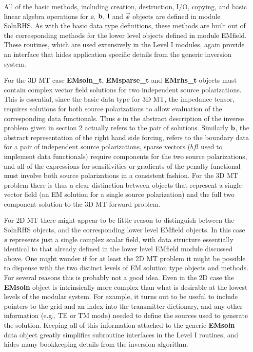 All of the basic methods, including creation, destruction,
I/O, copying, and basic linear algebra operations for $\ee$, ${\bf b}$,
$\bf l$ and $\vec\ee$ objects are defined in module SolnRHS.  
As with the basic data type definitions, 
these methods are built out of the corresponding
methods for the lower level objects defined in module EMfield.
These routines, which are used extensively in the
Level I modules,  again provide an interface that hides 
application specific details from the generic inversion system.

For the 3D MT case {\bf EMsoln\_t}, {\bf EMsparse\_t}
and {\bf EMrhs\_t} objects must contain complex
vector field solutions for two independent source polarizations.  
This is essential, since the basic data type for
3D MT, the impedance tensor, requires solutions for both
source polarizations to allow evaluation of the corresponding data
functionals.  Thus $\ee$ in the abstract description of the inverse
problem given in section 2 actually refers to the pair of solutions.
Similarly ${\bf b}$, the abstract representation of the right hand 
side forcing, refers to the boundary data for a pair of
independent source polarizations,
sparse vectors ($bf l$ used to implement data functionals)
require components for the two source polarizations, 
and all of the expressions for sensitivities
or gradients of the penalty functional must involve both source
polarizations in a consistent fashion.  
For the 3D MT problem
there is thus a clear distinction between
objects that represent a single vector field (an EM solution
for a single source polarization)
and the full two component solution to the 3D MT forward problem.  

For 2D MT there might appear to be little reason 
to distinguish between the SolnRHS objects, 
and the corresponding lower level EMfield objects.
In this case $\ee$ represents just a single complex scalar field,
with data structure essentially identical
to that already defined in the lower
level EMfield module discussed above.
One might wonder if for at least the 2D MT problem it might
be possible to dispense with the two distinct levels
of EM solution type objects and methods.  
For several reasons this is probably not a good idea. 
Even in the 2D case the {\bf EMsoln} object 
is intrinsically more complex than what is desirable
at the lowest levels of the modular system.
For example, it turns out to be useful to include pointers to the
grid and an index into the transmitter dictionary, 
and any other information (e.g., TE or TM mode)
needed to define the sources used to generate the solution.
Keeping all of this information attached to the generic
{\bf EMsoln} data object greatly simplifies subroutine interfaces
in the Level I routines, and hides many bookkeeping details
from the inversion algorithm.

